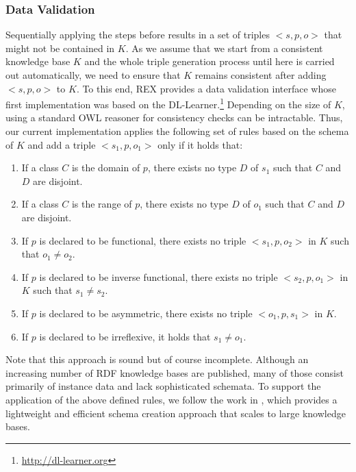 \subsubsection{Data Validation}\label{axioms}
Sequentially applying the steps before results in a set of triples $<s,p,o>$ that might not be contained in $K$. 
As we assume that we start from a consistent knowledge base $K$ and the whole triple generation process until here is carried out automatically, we need to ensure that $K$ remains consistent after adding $<s,p,o>$ to $K$.
To this end, REX provides a data validation interface whose first implementation was based on the DL-Learner.\footnote{\url{http://dl-learner.org}}
Depending on the size of $K$, using a standard OWL reasoner for consistency checks can be intractable.
Thus, our current implementation applies the following set of rules based on the schema of $K$ and add a triple $<s_1,p,o_1>$ only if it holds that:
\begin{enumerate}
\item If a class $C$ is the domain of $p$, there exists no type $D$ of $s_1$ such that $C$ and $D$ are disjoint.
\item If a class $C$ is the range of $p$, there exists no type $D$ of $o_1$ such that $C$ and $D$ are disjoint.
\item If $p$ is declared to be functional, there exists no triple $<s_1,p,o_2>$ in $K$ such that $o_1 \neq o_2$.
\item If $p$ is declared to be inverse functional, there exists no triple $<s_2,p,o_1>$ in $K$ such that $s_1 \neq s_2$.
\item If $p$ is declared to be asymmetric, there exists no triple $<o_1,p,s_1>$ in $K$.
\item If $p$ is declared to be irreflexive, it holds that $s_1 \neq o_1$.
\end{enumerate}
Note that this approach is sound but of course incomplete.
Although an increasing number of RDF knowledge bases are published, many of those consist primarily of instance data and lack sophisticated schemata. 
To support the application of the above defined rules, we follow the work in \cite{Buehmann2012,pattern_enrichment}, which provides a lightweight and efficient schema creation approach that scales to large knowledge bases. 


